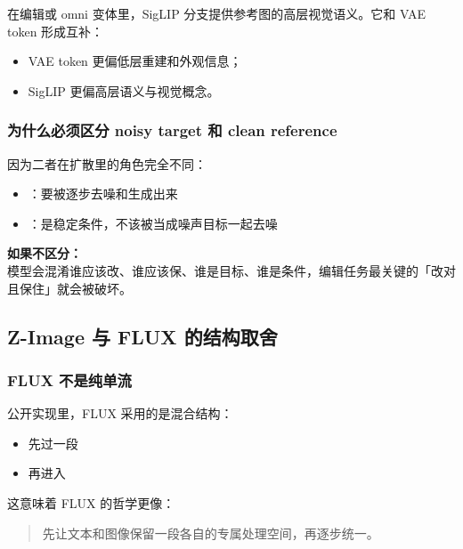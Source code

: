 在编辑或 omni 变体里，SigLIP 分支提供参考图的高层视觉语义。它和 VAE token 形成互补：

\begin{itemize}[leftmargin=1.5em]
  \item VAE token 更偏低层重建和外观信息；
  \item SigLIP 更偏高层语义与视觉概念。
\end{itemize}

\subsubsection{为什么必须区分 noisy target 和 clean reference}

因为二者在扩散里的角色完全不同：

\begin{itemize}[leftmargin=1.5em]
  \item {}：要被逐步去噪和生成出来
  \item {}：是稳定条件，不该被当成噪声目标一起去噪
\end{itemize}

\begin{warnbox}
\textbf{如果不区分：}\\
模型会混淆谁应该改、谁应该保、谁是目标、谁是条件，编辑任务最关键的「改对且保住」就会被破坏。
\end{warnbox}

\subsection{Z-Image 与 FLUX 的结构取舍}

\subsubsection{FLUX 不是纯单流}

公开实现里，FLUX 采用的是混合结构：

\begin{itemize}[leftmargin=1.5em]
  \item 先过一段 
  \item 再进入 
\end{itemize}

这意味着 FLUX 的哲学更像：

\begin{quote}
先让文本和图像保留一段各自的专属处理空间，再逐步统一。
\end{quote}

